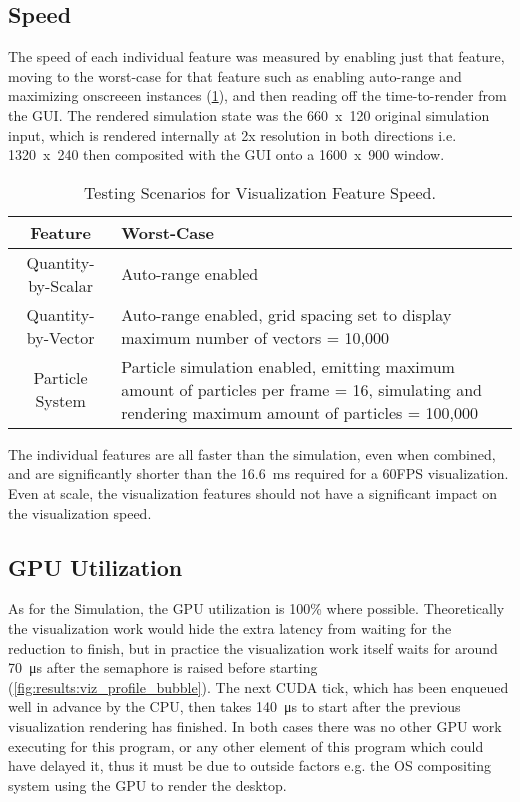 \subsection{Speed}\label{sec:Results:Viz:Speed}
The speed of each individual feature was measured by enabling just that feature, moving to the worst-case for that feature such as enabling auto-range and maximizing onscreeen instances (\cref{tab:results:vizworstcases}), and then reading off the time-to-render from the GUI.
The rendered simulation state was the 660~x~120 original simulation input, which is rendered internally at 2x resolution in both directions i.e. 1320~x~240 then composited with the GUI onto a 1600~x~900 window.

\begin{table}[]
    \centering
    \begin{tabular}{c|p{}}
        Feature & Worst-Case \\
        \hline
        Quantity-by-Scalar & Auto-range enabled \\
        Quantity-by-Vector & Auto-range enabled, grid spacing set to display maximum number of vectors = 10,000 \\
        Particle System & Particle simulation enabled, emitting maximum amount of particles per frame = 16, simulating and rendering maximum amount of particles = 100,000 \\
    \end{tabular}
    \caption{Testing Scenarios for Visualization Feature Speed.}
    \label{tab:results:vizworstcases}
\end{table}



The individual features are all faster than the simulation, even when combined, and are significantly shorter than the \SI{16.6}{\milli\second} required for a 60FPS visualization.
Even at scale, the visualization features should not have a significant impact on the visualization speed.

\subsection{GPU Utilization}\label{sec:Results:Viz:Efficiency}

As for the Simulation, the GPU utilization is 100\% where possible.
Theoretically the visualization work would hide the extra latency from waiting for the reduction to finish, but in practice the visualization work itself waits for around \SI{70}{\micro\second} after the semaphore is raised before starting (\cref{fig:results:viz_profile_bubble}).
The next CUDA tick, which has been enqueued well in advance by the CPU, then takes \SI{140}{\micro\second} to start after the previous visualization rendering has finished.
In both cases there was no other GPU work executing for this program, or any other element of this program which could have delayed it, thus it must be due to outside factors e.g. the OS compositing system using the GPU to render the desktop.


